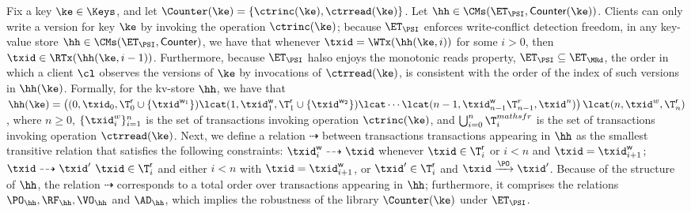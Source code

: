 Fix a key $\ke \in \Keys$, and let $\Counter(\ke) = \{\ctrinc(\ke), 
\ctrread(\ke)\}$. Let $\hh \in \CMs(\ET_{\PSI}, \mathsf{Counter}(\ke))$.
Clients can only write a version for key $\ke$ by invoking the 
operation $\ctrinc(\ke)$; because $\ET_{\PSI}$ 
enforces write-conflict detection freedom, in any key-value store 
$\hh \in \CMs(\ET_{\PSI}, \mathsf{Counter})$, we have that 
whenever $\txid = \WTx(\hh(\ke, i))$ for some $i > 0$, then 
$\txid \in \RTx(\hh(\ke, i-1))$. Furthermore, because 
$\ET_{\PSI}$ halso enjoys the monotonic reads property, 
$\ET_{\PSI} \subseteq \ET_{\MRd}$, the order in which 
a client $\cl$ observes the versions of $\ke$ by invocations of $\ctrread(\ke)$, 
is consistent with the order of the index of such versions in $\hh(\ke)$. 
Formally, for the kv-store $\hh$, we have that 
$\hh(\ke) = \left( (0, \txid_{0}, \T^{\mathsf{r}}_{0} \cup \{\txid^{\mathsf{w}_{1}}\}) 
\lcat (1, \txid^{\mathsf{w}}_{1}, \T^{\mathsf{r}}_{1} \cup \{\txid^{\mathsf{w}_{2}}\}) 
\lcat \cdots \lcat (n-1, \txid^{\mathsf{w}}_{n-1} \T^{r}_{n-1}, \txid^{n}) \right) \lcat 
(n, \txid^{w}, \T^{\mathsf{r}}_{n})$, where $n \geq 0$, $\{\txid^{w}_{i}\}_{i=1}^{n}$ is the 
set of transactions invoking operation $\ctrinc(\ke)$, and $\bigcup_{i=0}^{n} 
\T^{mathsf{r}}_{i}$ is the set of transactions invoking operation $\ctrread(\ke)$. 
Next, we define a relation $\dashrightarrow$ between transactions
transactions appearing in $\hh$ as the smallest transitive relation that 
satisfies the following constraints: $\txid^{\mathsf{w}}_{i} 
\dashrightarrow \txid$ whenever $\txid \in \T^{\mathsf{r}}_{i}$ 
or $i < n$ and $\txid = \txid^{\mathsf{w}}_{i+1}$; $\txid \dashrightarrow 
\txid'$ $\txid \in \T^{\mathsf{r}}_{i}$ and either $i < n$ with $\txid = \txid^{\mathsf{w}}_{i+1}$, 
or $\txid' \in \T^{\mathsf{r}}_{i}$ and $\txid \xrightarrow{\PO} \txid'$. 
Because of the structure of $\hh$, the relation $\dashrightarrow$ corresponds to a 
total order over transactions appearing in $\hh$; furthermore, it comprises 
the relations $\PO_{\hh}, \RF_{\hh}, \VO_{\hh}$ and $\AD_{\hh}$, which implies 
the robustness of the library $\Counter(\ke)$ under $\ET_{\PSI}$.



